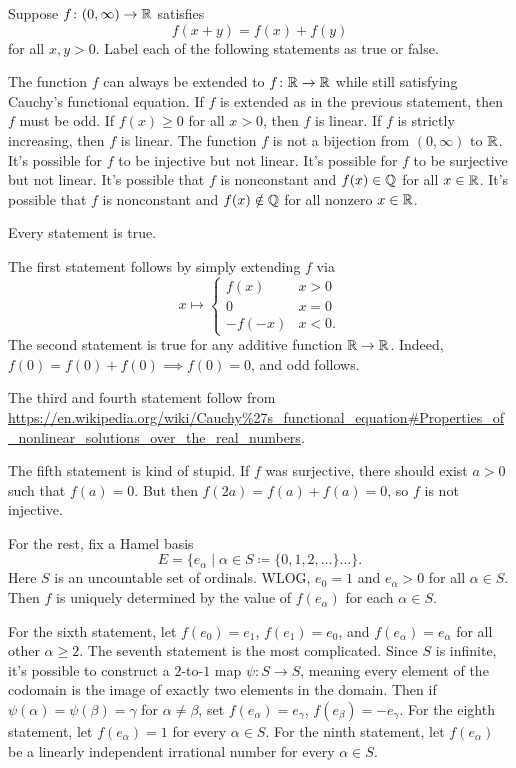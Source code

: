 \begin{problem}
	Suppose $f \colon (0,\infty) \to \mathbb R$ satisfies
	\[ f(x+y) = f(x) + f(y) \]
	for all $x,y > 0$.
	Label each of the following statements as true or false.
	\begin{enumerate}
		\ii The function $f$ can always be extended to $f \colon \mathbb R \to \mathbb R$
		while still satisfying Cauchy's functional equation.
		\ii If $f$ is extended as in the previous statement, then $f$ must be odd.
		\ii If $f(x) \ge 0$ for all $x > 0$, then $f$ is linear.
		\ii If $f$ is strictly increasing, then $f$ is linear.
		\ii The function $f$ is not a bijection from $(0,\infty)$ to $\mathbb R$.
		\ii It's possible for $f$ to be injective but not linear.
		\ii It's possible for $f$ to be surjective but not linear.
		\ii It's possible that $f$ is nonconstant and $f(x) \in \mathbb Q$ for all $x \in \mathbb R$.
		\ii It's possible that $f$ is nonconstant and $f(x) \notin \mathbb Q$
		for all nonzero $x \in \mathbb R$.
	\end{enumerate}
	\begin{sol}
	Every statement is true.

	The first statement follows by simply extending $f$ via
	\[
		x \mapsto
		\begin{cases}
			f(x) & x > 0 \\
			0 & x = 0 \\
			-f(-x) & x < 0.
		\end{cases}
	\]
	The second statement is true for any additive function $\mathbb R \to \mathbb R$.
	Indeed, $f(0) = f(0)+f(0) \implies f(0)=0$, and odd follows.

	The third and fourth statement follow from
	\url{https://en.wikipedia.org/wiki/Cauchy\%27s_functional_equation#Properties_of_nonlinear_solutions_over_the_real_numbers}.

	The fifth statement is kind of stupid.
	If $f$ was surjective, there should exist $a > 0$ such that $f(a) = 0$.
	But then $f(2a) = f(a)+f(a) = 0$, so $f$ is not injective.

	For the rest, fix a Hamel basis
	\[ E = \{e_\alpha \mid \alpha \in S \coloneqq \{ 0,1,2,\dots\} \dots \}. \]
	Here $S$ is an uncountable set of ordinals.
	WLOG, $e_0 = 1$ and $e_\alpha > 0$ for all $\alpha \in S$.
	Then $f$ is uniquely determined by the value of $f(e_\alpha)$ for each $\alpha \in S$.
	\begin{itemize}
		\ii For the sixth statement, let $f(e_0) = e_1$, $f(e_1) = e_0$,
		and $f(e_\alpha) = e_\alpha$ for all other $\alpha \ge 2$.
		\ii The seventh statement is the most complicated.
		Since $S$ is infinite, it's possible to construct a $2$-to-$1$ map
		$\psi \colon S \to S$, meaning every element of the codomain
		is the image of exactly two elements in the domain.
		Then if $\psi(\alpha) = \psi(\beta) = \gamma$ for $\alpha \neq \beta$,
		set $f(e_\alpha) = e_\gamma$, $f(e_\beta) = -e_\gamma$.
		\ii For the eighth statement, let $f(e_\alpha) = 1$ for every $\alpha \in S$.
		\ii For the ninth statement, let $f(e_\alpha)$ be
		a linearly independent irrational number for every $\alpha \in S$.
	\end{itemize}
	\end{sol}
\end{problem}

